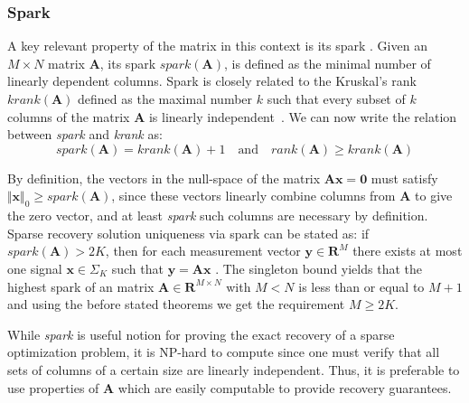 \documentclass[journal]{IEEEtran}
\begin{document}
\subsubsection{Spark}
A key relevant property of the matrix in this context is its spark \cite{donoho2003optimally}. Given an $M\times N$ matrix $\boldsymbol{A}$, its spark $spark(\boldsymbol{A})$, is defined as the minimal number of linearly dependent columns. Spark is closely related to the Kruskal's rank $krank(\boldsymbol{A})$ defined as the maximal number $k$ such that every subset of $k$ columns of the matrix $\boldsymbol{A}$ is linearly independent~\cite{kruskal1977three}. We can now write the relation between \textit{spark} and \textit{krank} as:
%
\begin{equation} \label{eq:skrank}
	spark(\boldsymbol{A})=krank(\boldsymbol{A})+1\quad \text{and} \quad rank(\boldsymbol{A})\geq krank(\boldsymbol{A})
\end{equation}

By definition, the vectors in the null-space of the matrix $\boldsymbol{A}\boldsymbol{x}=\boldsymbol{0}$ must satisfy $\Vert \boldsymbol{x}\Vert_0\geq spark(\boldsymbol{A})$, since these vectors linearly combine columns from $\boldsymbol{A}$ to give the zero vector, and at least \textit{spark} such columns are necessary by definition. Sparse recovery solution uniqueness via spark can be stated as: if $spark(\boldsymbol{A})>2K$, then for each measurement vector $\boldsymbol{y}\in\mathbf{R}^M$ there exists at most one signal $\boldsymbol{x}\in\Sigma_K$ such that $\boldsymbol{y}=\boldsymbol{A}\boldsymbol{x}$ \cite{Rish2015}. The singleton bound yields that the highest spark of an matrix $\boldsymbol{A}\in\mathbf{R}^{M\times N}$ with $M<N$ is less than or equal to $M+1$ and using the before stated theorems we get the requirement $M\geq 2K$.

While \textit{spark} is useful notion for proving the exact recovery of a sparse optimization problem, it is NP-hard to compute since one must verify that all sets of columns of a certain size are linearly independent. Thus, it is preferable to use properties of $\boldsymbol{A}$ which are easily computable to provide recovery guarantees.
\end{document}
